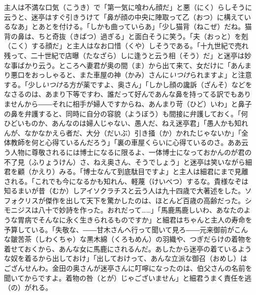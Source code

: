 \documentclass{book}
\begin{document}
主人は不満な口気（こうき）で「第一気に喰わん顔だ」と悪（にく）らしそうに云うと、迷亭はすぐ引きうけて「鼻が顔の中央に陣取って乙（おつ）に構えているなあ」とあとを付ける。「しかも曲っていらあ」「少し猫背（ねこぜ）だね。猫背の鼻は、ちと奇抜（きばつ）過ぎる」と面白そうに笑う。「夫（おっと）を剋（こく）する顔だ」と主人はなお口惜（くや）しそうである。「十九世紀で売れ残って、二十世紀で店曝（たなざら）しに逢うと云う相（そう）だ」と迷亭は妙な事ばかり云う。ところへ妻君が奥の間（ま）から出て来て、女だけに「あんまり悪口をおっしゃると、また車屋の神（かみ）さんに\emph{いつけ}られますよ」と注意する。「少し\emph{いつけ}る方が薬ですよ、奥さん」「しかし顔の讒訴（ざんそ）などをなさるのは、あまり下等ですわ、誰だって好んであんな鼻を持ってる訳でもありませんから――それに相手が婦人ですからね、あんまり苛（ひど）いわ」と鼻子の鼻を弁護すると、同時に自分の容貌（ようぼう）も間接に弁護しておく。「何ひどいものか、あんなのは婦人じゃない、愚人だ、ねえ迷亭君」「愚人かも知れんが、なかなかえら者だ、大分（だいぶ）引き掻（か）かれたじゃないか」「全体教師を何と心得ているんだろう」「裏の車屋くらいに心得ているのさ。ああ云う人物に尊敬されるには博士になるに限るよ、一体博士になっておかんのが君の不了見（ふりょうけん）さ、ねえ奥さん、そうでしょう」と迷亭は笑いながら細君を顧（かえり）みる。「博士なんて到底駄目ですよ」と主人は細君にまで見離される。「これでも今になるかも知れん、軽蔑（けいべつ）するな。貴様なぞは知るまいが昔（むか）しアイソクラチスと云う人は九十四歳で大著述をした。ソフォクリスが傑作を出して天下を驚かしたのは、ほとんど百歳の高齢だった。シモニジスは八十で妙詩を作った。おれだって\ldots{}\ldots{}」「馬鹿馬鹿しいわ、あなたのような胃病でそんなに永く生きられるものですか」と細君はちゃんと主人の寿命を予算している。「失敬な、――甘木さんへ行って聞いて見ろ――元来御前がこんな皺苦茶（しわくちゃ）な黒木綿（くろもめん）の羽織や、つぎだらけの着物を着せておくから、あんな女に馬鹿にされるんだ。あしたから迷亭の着ているような奴を着るから出しておけ」「出しておけって、あんな立派な御召（おめし）はござんせんわ。金田の奥さんが迷亭さんに叮嚀になったのは、伯父さんの名前を聞いてからですよ。着物の咎（とが）じゃございません」と細君うまく責任を逃（の）がれる。\\
\end{document}
